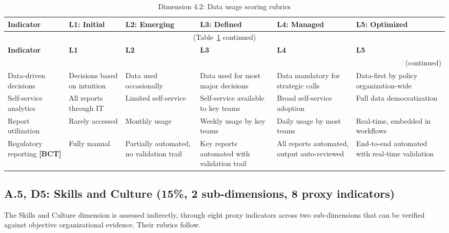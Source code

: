 \begin{center}
{\small
\begin{longtable}{|p{2.4cm}|p{2.0cm}|p{2.0cm}|p{2.2cm}|p{2.2cm}|p{2.2cm}|}
\caption{Dimension 4.2: Data usage scoring rubrics}\label{tab:d4-2}\\

\hline
\textbf{Indicator} & \textbf{L1: Initial} & \textbf{L2: Emerging} & \textbf{L3: Defined} & \textbf{L4: Managed} & \textbf{L5: Optimized} \\
\hline
\endfirsthead
\multicolumn{6}{c}{\small (Table~\ref{tab:d4-2} continued)} \\
\hline
\textbf{Indicator} & \textbf{L1} & \textbf{L2} & \textbf{L3} & \textbf{L4} & \textbf{L5} \\
\hline
\endhead
\hline
\multicolumn{6}{r}{\small (continued)} \\
\endfoot
\hline
\endlastfoot
Data-driven decisions &
  Decisions based on intuition &
  Data used occasionally &
  Data used for most major decisions &
  Data mandatory for strategic calls &
  Data-first by policy organization-wide \\
\hline
Self-service analytics &
  All reports through IT &
  Limited self-service &
  Self-service available to key teams &
  Broad self-service adoption &
  Full data democratization \\
\hline
Report utilization &
  Rarely accessed &
  Monthly usage &
  Weekly usage by key teams &
  Daily usage by most teams &
  Real-time, embedded in workflows \\
\hline
Regulatory reporting \textbf{[BCT]} &
  Fully manual &
  Partially automated, no validation trail &
  Key reports automated with validation trail &
  All reports automated, output auto-reviewed &
  End-to-end automated with real-time validation \\
\hline
\end{longtable}
}
\end{center}


\subsection*{A.5, D5: Skills and Culture (15\%, 2 sub-dimensions, 8 proxy indicators)}

The Skills and Culture dimension is assessed indirectly, through eight proxy indicators across two sub-dimensions that can be verified against objective organizational evidence. Their rubrics follow.

